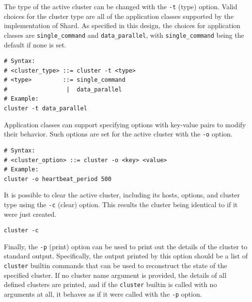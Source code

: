 \documentclass[twoside]{report}
\begin{document}
The type of the active cluster can be changed with the \texttt{-t} (type) option.
Valid choices for the cluster type are all of the application classes supported by the implementation of Shard.
As specified in this design, the choices for application classes are \texttt{single\_command} and \texttt{data\_parallel}, with \texttt{single\_command} being the default if none is set.

\begin{minipage}[c]{\textwidth-15pt}
  \begin{lstlisting}[language=Shard]
# Syntax:
# <cluster_type> ::= cluster -t <type>
# <type>         ::= single_command
#                 |  data_parallel
# Example:
cluster -t data_parallel
\end{lstlisting}
  \smallskip
\end{minipage}

Application classes can support specifying options with key-value pairs to modify their behavior. Such options are set for the active cluster with the \texttt{-o} option.

\begin{minipage}[c]{\textwidth-15pt}
  \begin{lstlisting}[language=Shard]
# Syntax:
# <cluster_option> ::= cluster -o <key> <value>
# Example:
cluster -o heartbeat_period 500
\end{lstlisting}
  \smallskip
\end{minipage}

It is possible to clear the active cluster, including its hosts, options, and cluster type using the \texttt{-c} (clear) option.
This results the cluster being identical to if it were just created.

\begin{minipage}[c]{\textwidth-15pt}
  \begin{lstlisting}[language=Shard]
cluster -c
\end{lstlisting}
  \smallskip
\end{minipage}

Finally, the \texttt{-p} (print) option can be used to print out the details of the cluster to standard output.
Specifically, the output printed by this option should be a list of \texttt{cluster} builtin commands that can be used to reconstruct the state of the specified cluster.
If no cluster name argument is provided, the details of all defined clusters are printed, and if the \texttt{cluster} builtin is called with no arguments at all, it behaves as if it were called with the \texttt{-p} option.
\end{document}
